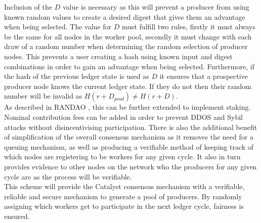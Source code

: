 Inclusion of the $D$ value is necessary as this will prevent a producer from using known random values to create a desired digest that gives them an advantage when being selected. The value for $D$ must fulfill two rules, firstly it must always be the same for all nodes in the worker pool, secondly it must change with each draw of a random number when determining the random selection of producer nodes. This prevents a user creating a hash using known input and digest combinations in order to gain an advantage when being selected. Furthermore, if the hash of the previous ledger state is used as $D$ it ensures that a prospective producer node knows the current ledger state. If they do not then their random number will be invalid as $H(r + D_{prod}) \neq H(r + D)$. \\

As described in RANDAO \cite{randao}, this can be further extended to implement staking. Nominal contribution fees can be added in order to prevent DDOS and Sybil attacks without disincentivising participation. There is also the additional benefit of simplification of the overall consensus mechanism as it removes the need for a queuing mechanism, as well as producing a verifiable method of keeping track of which nodes are registering to be workers for any given cycle. It also in turn provides evidence to other nodes on the network who the producers for any given cycle are as the process will be verifiable. \\

This scheme will provide the Catalyst consensus mechanism with a verifiable, reliable and secure mechanism to generate a pool of producers. By randomly assigning which workers get to participate in the next ledger cycle, fairness is ensured. \\
